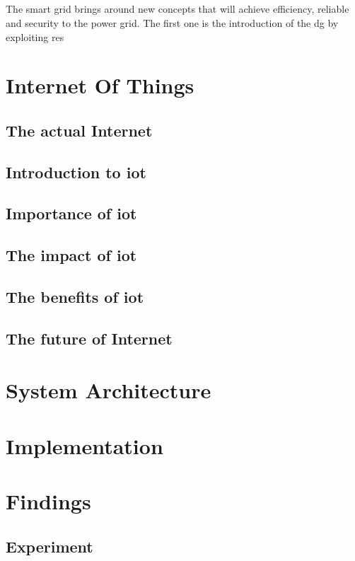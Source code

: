 \documentclass[oneside,12pt,a4paper,final]{book}
\begin{document}
\paragraph{}
The smart grid brings around new concepts that will achieve efficiency, reliable and security to the power grid. The first one is the introduction of the \gls{dg} by exploiting \gls{res} \cite{ref6}

\chapter{Internet Of Things}

\section{The actual Internet}
\section{Introduction to \gls{iot}}
\section{Importance of \gls{iot}}
\section{The impact of \gls{iot}}
\section{The benefits of \gls{iot}}
\section{The future of Internet}


\chapter{System Architecture}

\chapter{Implementation}


\chapter{Findings}
\section{Experiment}
\end{document}
